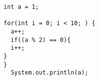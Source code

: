 \documentclass{article}
\begin{document}
\begin{flushleft}
\begin{comment}
 \hline
\end{tabu}
\end{comment}



\begin{verbatim}
  int a = 1;
  
  for(int i = 0; i < 10; ) {
    a++;
    if((a % 2) == 0){
    i++;
  }
  }
    System.out.println(a);
\end{verbatim}














\end{flushleft}










\begin{comment}
\begin{verbatim}
  int main() {
    printf('hello world'):
    return 0;
  }
\end{verbatim}
\end{comment}
\end{document}
